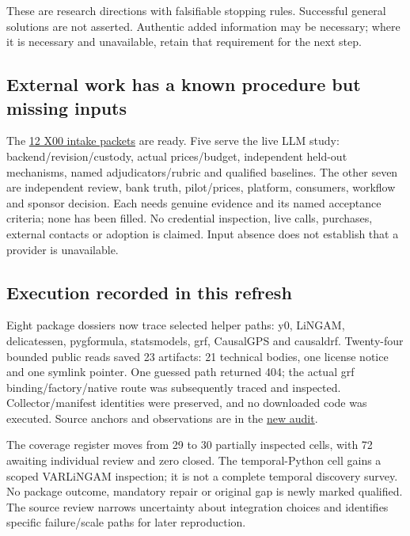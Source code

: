 \documentclass[
  10pt,
]{article}
\begin{document}
These are research directions with falsifiable stopping rules.
Successful general solutions are not asserted. Authentic added
information may be necessary; where it is necessary and unavailable,
retain that requirement for the next step.

\hypertarget{external-work-has-a-known-procedure-but-missing-inputs}{%
\subsection{External work has a known procedure but missing
inputs}\label{external-work-has-a-known-procedure-but-missing-inputs}}

The \href{gap-repair-v13/work/X00/intake-packets.json}{12 X00 intake
packets} are ready. Five serve the live LLM study:
backend/revision/custody, actual prices/budget, independent held-out
mechanisms, named adjudicators/rubric and qualified baselines. The other
seven are independent review, bank truth, pilot/prices, platform,
consumers, workflow and sponsor decision. Each needs genuine evidence
and its named acceptance criteria; none has been filled. No credential
inspection, live calls, purchases, external contacts or adoption is
claimed. Input absence does not establish that a provider is
unavailable.

\hypertarget{execution-recorded-in-this-refresh}{%
\subsection{Execution recorded in this
refresh}\label{execution-recorded-in-this-refresh}}

Eight package dossiers now trace selected helper paths: y0, LiNGAM,
delicatessen, pygformula, statsmodels, grf, CausalGPS and causaldrf.
Twenty-four bounded public reads saved 23 artifacts: 21 technical
bodies, one license notice and one symlink pointer. One guessed path
returned 404; the actual grf binding/factory/native route was
subsequently traced and inspected. Collector/manifest identities were
preserved, and no downloaded code was executed. Source anchors and
observations are in the
\href{gap-execution-v13_1/work/SW01/source-audit.json}{new audit}.

The coverage register moves from 29 to 30 partially inspected cells,
with 72 awaiting individual review and zero closed. The temporal-Python
cell gains a scoped VARLiNGAM inspection; it is not a complete temporal
discovery survey. No package outcome, mandatory repair or original gap
is newly marked qualified. The source review narrows uncertainty about
integration choices and identifies specific failure/scale paths for
later reproduction.
\end{document}
